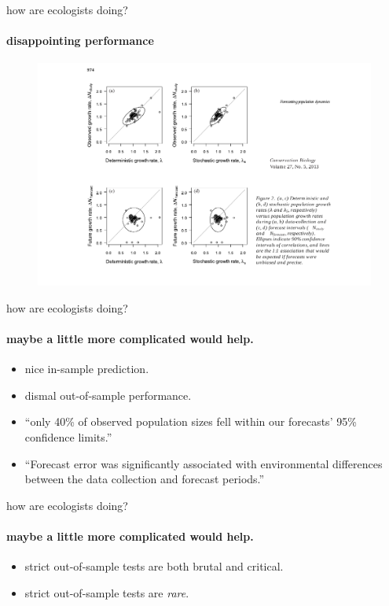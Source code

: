 \documentclass[show notes]{beamer}
\begin{document}
\begin{frame}{how are ecologists doing?}
  \framesubtitle{disappointing performance} 
 
  \begin{figure}
  \includegraphics[clip, trim=50 0 0 0, width=\textwidth]{prediction-fail-figure.pdf}
  \end{figure}
  	
\end{frame}



\begin{frame}{how are ecologists doing?}
  \framesubtitle{maybe a little more complicated would help.} 
  
   \begin{itemize}
   \item nice in-sample prediction.
   \item dismal out-of-sample performance.
   \item ``only 40\% of observed population sizes fell within our forecasts' 95\% confidence limits.''
   \item ``Forecast error was significantly associated with environmental differences between the data collection and forecast periods.''
   \end{itemize}
\end{frame}




\begin{frame}{how are ecologists doing?}
  \framesubtitle{maybe a little more complicated would help.} 
   \begin{itemize}
   \item strict out-of-sample tests are both brutal and critical.
   \item strict out-of-sample tests are \emph{rare}.
   \end{itemize}
\end{frame}
\end{document}
